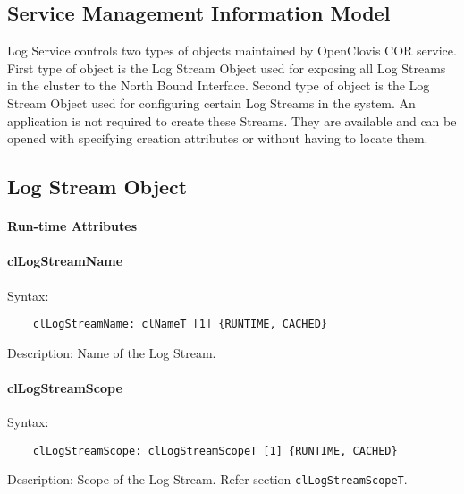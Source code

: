 \begin{flushleft}
\chapter{Service Management Information Model}
Log Service controls two types of objects maintained by OpenClovis COR service. First type of object is the Log Stream Object used for
exposing all Log Streams in the cluster to the North Bound Interface. Second type of object is the Log Stream Object used for configuring certain
Log Streams in the system. An application is not required to create these Streams. They are available and can be 
opened with specifying creation attributes or without having to locate them.



\section{Log Stream Object}
\subsubsection{Run-time Attributes}

\subsubsection{clLogStreamName}
\begin{Desc}
\item[Syntax:]
\footnotesize\begin{verbatim}        	
	clLogStreamName: clNameT [1] {RUNTIME, CACHED}
\end{verbatim}
\normalsize
\end{Desc}
\begin{Desc}
\item[Description:]
Name of the Log Stream.
\end{Desc}



\subsubsection{clLogStreamScope}
\begin{Desc}
\item[Syntax:]
\footnotesize\begin{verbatim}        	
	clLogStreamScope: clLogStreamScopeT [1] {RUNTIME, CACHED}
\end{verbatim}
\normalsize
\end{Desc}
\begin{Desc}
\item[Description:]
Scope of the Log Stream. Refer section {\tt{clLogStreamScopeT}}.
\end{Desc}



\end{flushleft}
